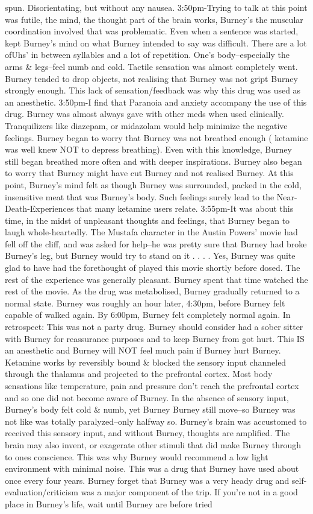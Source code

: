 \documentclass[12pt]{book}
\begin{document}
spun. Disorientating, but without any nausea. 3:50pm-Trying to talk at this point was futile, the mind, the thought part of the brain works, Burney's the muscular coordination involved that was problematic. Even when a sentence was started, kept Burney's mind on what Burney intended to say was difficult. There are a lot ofUhs' in between syllables and a lot of repetition. One's body--especially the arms \& legs--feel numb and cold. Tactile sensation was almost completely went. Burney tended to drop objects, not realising that Burney was not gript Burney strongly enough. This lack of sensation/feedback was why this drug was used as an anesthetic. 3:50pm-I find that Paranoia and anxiety accompany the use of this drug. Burney was almost always gave with other meds when used clinically. Tranquilizers like diazepam, or midazolam would help minimize the negative feelings. Burney began to worry that Burney was not breathed enough ( ketamine was well knew NOT to depress breathing). Even with this knowledge, Burney still began breathed more often and with deeper inspirations. Burney also began to worry that Burney might have cut Burney and not realised Burney. At this point, Burney's mind felt as though Burney was surrounded, packed in the cold, insensitive meat that was Burney's body. Such feelings surely lead to the Near-Death-Experiences that many ketamine users relate. 3:55pm-It was about this time, in the midst of unpleasant thoughts and feelings, that Burney began to laugh whole-heartedly. The Mustafa character in the Austin Powers' movie had fell off the cliff, and was asked for help--he was pretty sure that Burney had broke Burney's leg, but Burney would try to stand on it . . .  . Yes, Burney was quite glad to have had the forethought of played this movie shortly before dosed. The rest of the experience was generally pleasant. Burney spent that time watched the rest of the movie. As the drug was metabolised, Burney gradually returned to a normal state. Burney was roughly an hour later, 4:30pm, before Burney felt capable of walked again. By 6:00pm, Burney felt completely normal again. In retrospect: This was not a party drug. Burney should consider had a sober sitter with Burney for reassurance purposes and to keep Burney from got hurt. This IS an anesthetic and Burney will NOT feel much pain if Burney hurt Burney. Ketamine works by reversibly bound \& blocked the sensory input channeled through the thalamus and projected to the prefrontal cortex. Most body sensations like temperature, pain and pressure don't reach the prefrontal cortex and so one did not become aware of Burney. In the absence of sensory input, Burney's body felt cold \& numb, yet Burney Burney still move--so Burney was not like was totally paralyzed--only halfway so. Burney's brain was accustomed to received this sensory input, and without Burney, thoughts are amplified. The brain may also invent, or exagerate other stimuli that did make Burney through to ones conscience. This was why Burney would recommend a low light environment with minimal noise. This was a drug that Burney have used about once every four years. Burney forget that Burney was a very heady drug and self-evaluation/criticism was a major component of the trip. If you're not in a good place in Burney's life, wait until Burney are before tried 
\end{document}
